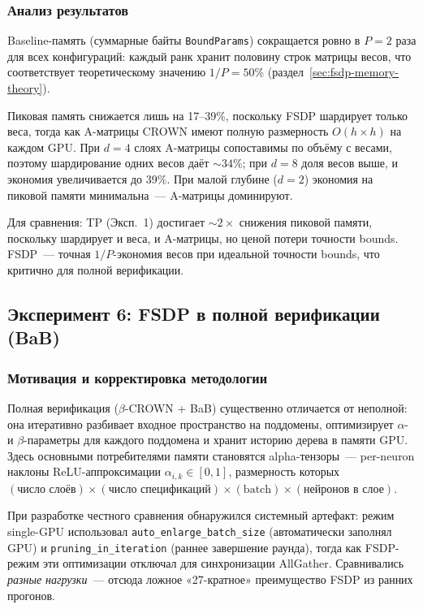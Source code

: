 \subsubsection{Анализ результатов}

Baseline-память (суммарные байты \texttt{BoundParams}) сокращается
ровно в $P{=}2$ раза для всех конфигураций: каждый ранк хранит
половину строк матрицы весов, что соответствует теоретическому
значению $1/P = 50\%$ (раздел~\ref{sec:fsdp-memory-theory}).

Пиковая память снижается лишь на 17--39\%, поскольку FSDP шардирует
только веса, тогда как A-матрицы CROWN имеют полную размерность
$O(h \times h)$ на каждом GPU.
При $d = 4$ слоях A-матрицы сопоставимы по объёму с весами, поэтому
шардирование одних весов даёт $\sim\!34\%$; при $d = 8$
доля весов выше, и экономия увеличивается до 39\%.
При малой глубине ($d = 2$) экономия на пиковой памяти минимальна~---
A-матрицы доминируют.

Для сравнения: TP (Эксп.~1) достигает $\sim\!2\times$ снижения пиковой
памяти, поскольку шардирует и веса, и A-матрицы, но ценой потери
точности bounds. FSDP~--- точная $1/P$-экономия весов при идеальной
точности bounds, что критично для полной верификации.

\subsection{Эксперимент 6: FSDP в полной верификации (BaB)}
\label{sec:exp6}

\subsubsection{Мотивация и корректировка методологии}

Полная верификация ($\beta$-CROWN\cite{betaCROWN2021} + BaB)
существенно отличается от неполной: она итеративно разбивает
входное пространство на поддомены, оптимизирует $\alpha$- и
$\beta$-параметры для каждого поддомена и хранит историю дерева
в памяти GPU.
Здесь основными потребителями памяти становятся alpha-тензоры~---
per-neuron наклоны ReLU-аппроксимации $\alpha_{i,k} \in [0, 1]$,
размерность которых $(\text{число слоёв}) \times
(\text{число спецификаций}) \times (\text{batch}) \times
(\text{нейронов в слое})$.

При разработке честного сравнения обнаружился системный артефакт:
режим single-GPU использовал \texttt{auto\_enlarge\_batch\_size}
(автоматически заполнял GPU) и \texttt{pruning\_in\_iteration}
(раннее завершение раунда), тогда как FSDP-режим эти оптимизации
отключал для синхронизации AllGather.
Сравнивались \textit{разные нагрузки}~--- отсюда ложное «27-кратное»
преимущество FSDP из ранних прогонов.

